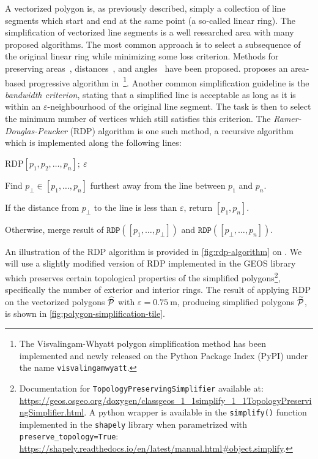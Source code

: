 A vectorized polygon is, as previously described, simply a collection of line segments which start and end at the same point (a so-called linear ring).
The simplification of vectorized line segments is a well researched area with many proposed algorithms.
The most common approach is to select a subsequence of the original linear ring while minimizing some loss criterion.
Methods for preserving areas~\cite{ls-area-preserving}, distances~\cite{ls-distance-preserving}, and angles~\cite{ls-angle-preserving} have been proposed.
\citeauthor{ls-vw} proposes an area-based progressive algorithm in~\cite{ls-vw}\footnote{The Visvalingam-Whyatt polygon simplification method has been implemented and newly released on the Python Package Index (PyPI) under the name \texttt{visvalingamwyatt}.}.
Another common simplification guideline is the \textit{bandwidth criterion}, stating that a simplified line is acceptable as long as it is within an $\varepsilon$-neighbourhood of the original line segment.
The task is then to select the minimum number of vertices which still satisfies this criterion.
The \textit{Ramer-Douglas-Peucker} (RDP) algorithm\cite{ls-rdp} is one such method, a recursive algorithm which is implemented along the following lines:
\begin{pseudofunc}{RDP}{$[p_1, p_2, \ldots, p_n];~\varepsilon$}
  \item Find $p_{\perp} \in [p_1, \ldots, p_n]$ furthest away from the line between $p_1$ and $p_n$.
  \item If the distance from $p_{\perp}$ to the line is less than $\varepsilon$, return $[p_1, p_n]$.
  \item Otherwise, merge result of $\texttt{RDP}([p_1, \ldots, p_{\perp}])$ and $\texttt{RDP}([p_{\perp}, \ldots, p_n])$.
\end{pseudofunc}
An illustration of the RDP algorithm is provided in \cref{fig:rdp-algorithm} on .
We will use a slightly modified version of RDP implemented in the GEOS library which preserves certain topological properties of the simplified polygons\footnote{Documentation for \texttt{TopologyPreservingSimplifier} available at: \url{https://geos.osgeo.org/doxygen/classgeos_1_1simplify_1_1TopologyPreservingSimplifier.html}. A python wrapper is available in the \texttt{simplify()} function implemented in the \texttt{shapely} library when parametrized with \texttt{preserve\_topology=True}: \url{https://shapely.readthedocs.io/en/latest/manual.html\#object.simplify}.}, specifically the number of exterior and interior rings.
The result of applying RDP on the vectorized polygons $\widehat{\mathcal{P}}$ with $\varepsilon = \SI{0.75}{\meter}$, producing simplified polygons $\widetilde{\mathcal{P}}$, is shown in \cref{fig:polygon-simplification-tile}.
